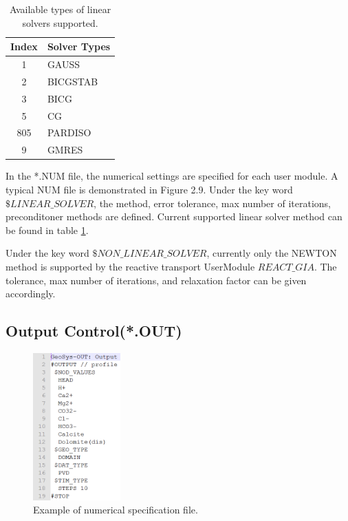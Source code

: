 \begin{table}
\label{tab:RT_tab_linear_solvers}
\caption{Available types of linear solvers supported. }
\begin{tabular}{c p{5.5cm}}
\hline
Index    & Solver Types  \\
\hline
 1  & GAUSS \\
 2  & BICGSTAB \\
 3  & BICG \\
 5  & CG \\
805 & PARDISO \\ 
 9  & GMRES \\ 
\hline
\end{tabular}
\end{table}

In the *.NUM file, the numerical settings are specified for each user module. A typical NUM file is demonstrated in Figure 2.9. Under the key word $\$LINEAR\_SOLVER$, the method, error tolerance, max number of iterations, preconditoner methods are defined. Current supported linear solver method can be found in table \ref{tab:RT_tab_linear_solvers}. 

Under the key word $\$NON\_LINEAR\_SOLVER$, currently only the NEWTON method is supported by the reactive transport UserModule $REACT\_GIA$.  The tolerance, max number of iterations, and relaxation factor can be given accordingly. 


\subsection{Output Control(*.OUT)}

\begin{figure}
\includegraphics[width=0.3\textwidth]{RT/figs/RT_fig_out_file}
\caption{Example of numerical specification file. }
\label{fig:RT_fig_out_file}
\end{figure}

